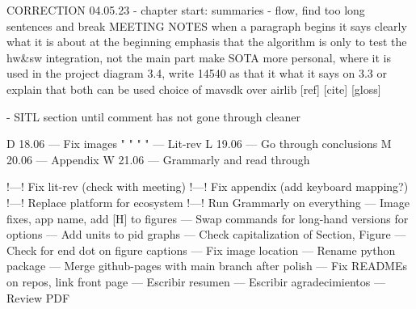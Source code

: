 CORRECTION 04.05.23
 - chapter start: summaries
 - flow, find too long sentences and break
 MEETING NOTES
when a paragraph begins it says clearly what it is about at the beginning
emphasis that the algorithm is only to test the hw&sw integration, not the main part
make SOTA more personal, where it is used in the project
diagram 3.4, write 14540 as that it what it says on 3.3 or explain that both can be used
choice of mavsdk over airlib
[ref] [cite] [gloss]

- SITL section until comment has not gone through cleaner

 

D 18.06 --- Fix images
" " " " --- Lit-rev
L 19.06 --- Go through conclusions
M 20.06 --- Appendix
W 21.06 --- Grammarly and read through

        !---! Fix lit-rev (check with meeting)
        !---! Fix appendix (add keyboard mapping?)
        !---! Replace platform for ecosystem
        !---! Run Grammarly on everything
        --- Image fixes, app name, add [H] to figures
        --- Swap commands for long-hand versions for options
        --- Add units to pid graphs
        --- Check capitalization of Section, Figure
        --- Check for end dot on figure captions
        --- Fix image location
        --- Rename python package
        --- Merge github-pages with main branch after polish
        --- Fix READMEs on repos, link front page
        --- Escribir resumen
        --- Escribir agradecimientos
        --- Review PDF